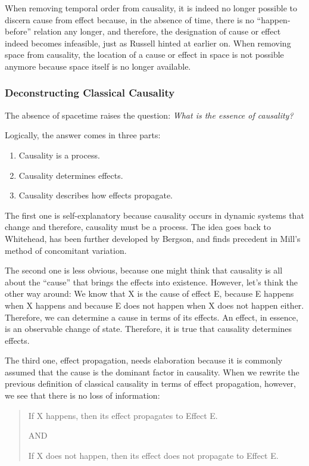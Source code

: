 When removing temporal order from causality, it is indeed no longer possible to discern cause from effect because, in the absence of time, there is no “happen-before” relation any longer, and therefore, the designation of cause or effect indeed becomes infeasible, just as Russell hinted at earlier on. When removing space from causality, the location of a cause or effect in space is not possible anymore because space itself is no longer available. 

\subsubsection{Deconstructing Classical Causality}

The absence of spacetime raises the question: \textit{What is the essence of causality?}

Logically, the answer comes in three parts:

\begin{enumerate}
    \item Causality is a process.
    \item Causality determines effects.
    \item Causality describes how effects propagate.
\end{enumerate}


The first one is self-explanatory because causality occurs in dynamic systems that change and therefore, causality must be a process. The idea goes back to Whitehead, has been further developed by Bergson, and finds precedent in Mill's method of concomitant variation\cite{mill2023system}.  

The second one is less obvious, because one might think that causality is all about the “cause” that brings the effects into existence. However, let’s think the other way around: We know that X is the cause of effect E, because E happens when X happens and because E does not happen when X does not happen either. Therefore, we can determine a cause in terms of its effects. An effect, in essence, is an observable change of state. Therefore, it is true that causality determines effects.

The third one, effect propagation, needs elaboration because it is commonly assumed that the cause is the dominant factor in causality. When we rewrite the previous definition of classical causality in terms of effect propagation, however, we see that there is no loss of information:

\begin{quote}
    If X happens, then its effect propagates to Effect E.

    AND
    
    If X does not happen, then its effect does not propagate to Effect E.
\end{quote}

